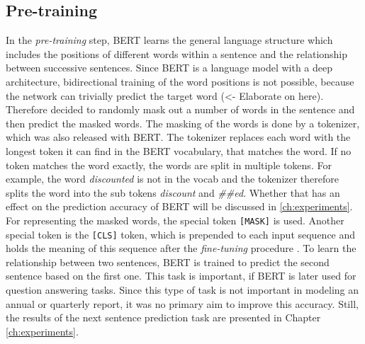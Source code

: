 \subsection{Pre-training}
In the \textit{pre-training} step, \ac{BERT} learns the general language structure which includes the positions of different words within a sentence and the relationship between successive sentences.
Since BERT is a language model with a deep architecture, bidirectional training of the word positions is not possible, because the network can trivially predict the target word (<- Elaborate on here). \cite[p. 4]{Devlin2018}
Therefore \cite{Devlin2018} decided to randomly mask out a number of words in the sentence and then predict the masked words.
The masking of the words is done by a tokenizer, which was also released with \ac{BERT}.
The tokenizer replaces each word with the longest token it can find in the \ac{BERT} vocabulary, that matches the word.
If no token matches the word exactly, the words are split in multiple tokens.
For example, the word \textit{discounted} is not in the vocab and the tokenizer therefore splits the word into the sub tokens \textit{discount} and \textit{\#\#ed}.
Whether that has an effect on the prediction accuracy of \ac{BERT} will be discussed in \ref{ch:experiments}.
For representing the masked words, the special token \texttt{[MASK]} is used.
Another special token is the \texttt{[CLS]} token, which is prepended to each input sequence and holds the meaning of this sequence after the \textit{fine-tuning} procedure \cite[p. 4]{Devlin2018}.
To learn the relationship between two sentences, \ac{BERT} is trained to predict the second sentence based on the first one.
This task is important, if \ac{BERT} is later used for question answering tasks.
Since this type of task is not important in modeling an annual or quarterly report, it was no primary aim to improve this accuracy.
Still, the results of the next sentence prediction task are presented in Chapter \ref{ch:experiments}.

